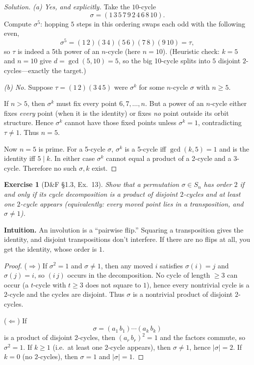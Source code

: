 \documentclass[12pt]{article}
\newtheorem{exercise}[theorem]{Exercise}
\theoremstyle{definition}
\begin{document}
\dotfill

\begin{proof}[Solution]
\emph{(a) Yes, and explicitly.}  
Take the $10$-cycle
\[
\sigma=(1\,3\,5\,7\,9\,2\,4\,6\,8\,10).
\]
Compute $\sigma^{5}$: hopping $5$ steps in this ordering swaps each odd with the following even,
\[
\sigma^{5}=(1\,2)(3\,4)(5\,6)(7\,8)(9\,10)=\tau,
\]
so $\tau$ is indeed a 5th power of an $n$-cycle (here $n=10$).  
(Heuristic check: $k=5$ and $n=10$ give $d=\gcd(5,10)=5$, so the big 10-cycle splits into $5$ disjoint $2$-cycles—exactly the target.)

\smallskip

\emph{(b) No.}  
Suppose $\tau=(1\,2)(3\,4\,5)$ were $\sigma^{k}$ for some $n$-cycle $\sigma$ with $n\ge 5$.

If $n>5$, then $\sigma^{k}$ must fix every point $6,7,\dots,n$. But a power of an $n$-cycle either fixes \emph{every} point (when it is the identity) or fixes \emph{no} point outside its orbit structure. Hence $\sigma^{k}$ cannot have those fixed points unless $\sigma^{k}=1$, contradicting $\tau\ne 1$. Thus $n=5$.

Now $n=5$ is prime. For a 5-cycle $\sigma$, $\sigma^{k}$ is a 5-cycle iff $\gcd(k,5)=1$ and is the identity iff $5\mid k$. In either case $\sigma^{k}$ cannot equal a product of a 2-cycle and a 3-cycle. Therefore no such $\sigma,k$ exist.
\end{proof}

\newpage

\begin{exercise}[D\&F §1.3, Ex.~13]
Show that a permutation $\sigma\in S_n$ has order $2$ if and only if its cycle decomposition
is a product of disjoint $2$-cycles \emph{and at least one $2$-cycle appears} (equivalently:
every moved point lies in a transposition, and $\sigma\neq 1$).
\end{exercise}

\dotfill

\noindent\textbf{Intuition.}
An involution is a “pairwise flip.” Squaring a transposition gives the identity, and disjoint
transpositions don’t interfere. If there are no flips at all, you get the identity, whose order is $1$.

\dotfill

\begin{proof}
($\Rightarrow$) If $\sigma^2=1$ and $\sigma\neq 1$, then any moved $i$ satisfies
$\sigma(i)=j$ and $\sigma(j)=i$, so $(i\,j)$ occurs in the decomposition. No cycle of
length $\ge3$ can occur (a $t$-cycle with $t\ge3$ does not square to $1$), hence every
nontrivial cycle is a $2$-cycle and the cycles are disjoint. Thus $\sigma$ is a nontrivial
product of disjoint $2$-cycles.

($\Leftarrow$) If
\[
\sigma=(a_1\,b_1)\cdots(a_k\,b_k)
\]
is a product of disjoint $2$-cycles, then $(a_r\,b_r)^2=1$ and the factors commute, so
$\sigma^2=1$. If $k\ge1$ (i.e.\ at least one $2$-cycle appears), then $\sigma\neq 1$, hence
$|\sigma|=2$. If $k=0$ (no $2$-cycles), then $\sigma=1$ and $|\sigma|=1$.
\end{proof}
\end{document}
